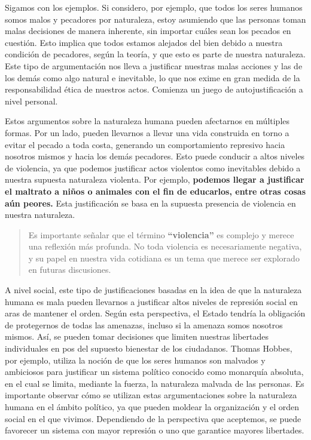 \documentclass[
  letterpaper,
  DIV=11,
  numbers=noendperiod]{scrartcl}
\begin{document}
Sigamos con los ejemplos. Si considero, por ejemplo, que todos los seres
humanos somos malos y pecadores por naturaleza, estoy asumiendo que las
personas toman malas decisiones de manera inherente, sin importar cuáles
sean los pecados en cuestión. Esto implica que todos estamos alejados
del bien debido a nuestra condición de pecadores, según la teoría, y que
esto es parte de nuestra naturaleza. Este tipo de argumentación nos
lleva a justificar nuestras malas acciones y las de los demás como algo
natural e inevitable, lo que nos exime en gran medida de la
responsabilidad ética de nuestros actos. Comienza un juego de
autojustificación a nivel personal.

Estos argumentos sobre la naturaleza humana pueden afectarnos en
múltiples formas. Por un lado, pueden llevarnos a llevar una vida
construida en torno a evitar el pecado a toda costa, generando un
comportamiento represivo hacia nosotros mismos y hacia los demás
pecadores. Esto puede conducir a altos niveles de violencia, ya que
podemos justificar actos violentos como inevitables debido a nuestra
supuesta naturaleza violenta. Por ejemplo, \textbf{podemos llegar a
justificar el maltrato a niños o animales con el fin de educarlos, entre
otras cosas aún peores.} Esta justificación se basa en la supuesta
presencia de violencia en nuestra naturaleza.

\begin{quote}
Es importante señalar que el término \textbf{``violencia''} es complejo
y merece una reflexión más profunda. No toda violencia es necesariamente
negativa, y su papel en nuestra vida cotidiana es un tema que merece ser
explorado en futuras discusiones.
\end{quote}

A nivel social, este tipo de justificaciones basadas en la idea de que
la naturaleza humana es mala pueden llevarnos a justificar altos niveles
de represión social en aras de mantener el orden. Según esta
perspectiva, el Estado tendría la obligación de protegernos de todas las
amenazas, incluso si la amenaza somos nosotros mismos. Así, se pueden
tomar decisiones que limiten nuestras libertades individuales en pos del
supuesto bienestar de los ciudadanos. Thomas Hobbes, por ejemplo,
utiliza la noción de que los seres humanos son malvados y ambiciosos
para justificar un sistema político conocido como monarquía absoluta, en
el cual se limita, mediante la fuerza, la naturaleza malvada de las
personas. Es importante observar cómo se utilizan estas argumentaciones
sobre la naturaleza humana en el ámbito político, ya que pueden moldear
la organización y el orden social en el que vivimos. Dependiendo de la
perspectiva que aceptemos, se puede favorecer un sistema con mayor
represión o uno que garantice mayores libertades.
\end{document}
